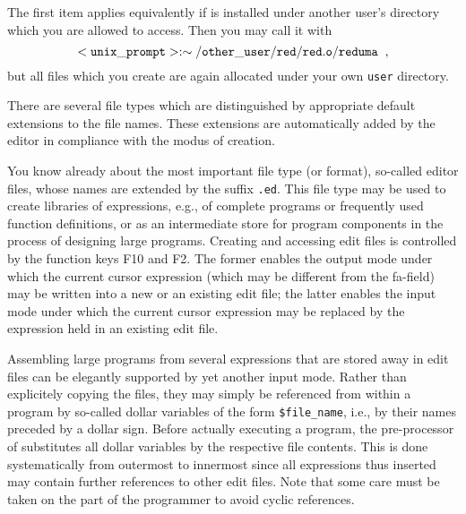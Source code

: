 The first item applies equivalently if \pired is installed under another
 user's directory which you
are allowed to access. Then you may call it with
$$
{\tt <unix\_prompt>:\sim/other\_user/red/red.o/reduma}\;\;,
$$
but all files which you create are again allocated under your own
{\tt user} directory. 

There are several {\mys file types} which are distinguished by appropriate
{\mys default extensions} to the file names. These extensions are automatically 
added by the editor in compliance with the modus of creation. 
 
You know already about the most important file type (or format),
 so-called {\mys editor files}, whose names are extended by the suffix 
{\tt .ed}. This file type may be used to create {\mys libraries} of 
\kir expressions, e.g., of complete programs or
frequently used function definitions, 
or as an intermediate store for program 
components in the process of designing large programs. Creating
and accessing edit files is controlled by the function keys
F10 and F2. The former enables the {\mys output mode} under which the
current cursor expression (which
may be different from the {\sc fa}-field) may be written into a
 new or an existing edit file;
the latter enables the {\mys input mode} under which the current
cursor expression may be replaced by the \kir expression held in
an existing edit file. 

Assembling  large programs from several \kir expressions that are stored away 
in edit files can be elegantly supported by yet another input mode. Rather
than explicitely copying the files, they may simply be referenced from within
a program by so-called {\mys dollar variables} of the form 
{\tt \$file\_name}, i.e., by their names preceded by a dollar sign. Before
actually executing a  program, 
the pre-processor of \pired substitutes all dollar variables
by the respective file contents. This is done systematically
from outermost to innermost since all
expressions thus inserted may contain further references to
other edit files. Note that some care must be taken on the part
 of the programmer to avoid {\mys cyclic references}.

